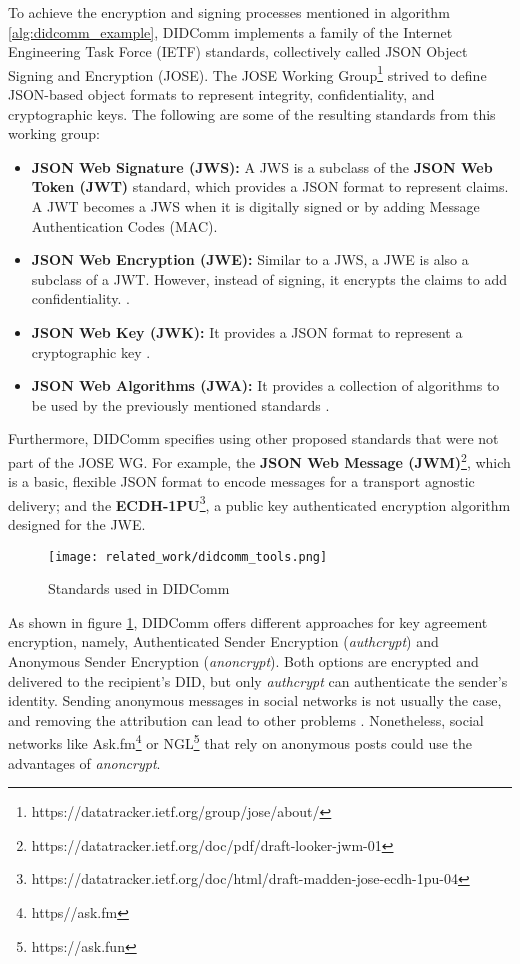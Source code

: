 To achieve the encryption and signing processes mentioned in algorithm \ref{alg:didcomm_example}, DIDComm implements a family of the Internet Engineering Task Force (IETF) standards, collectively called JSON Object Signing and Encryption (JOSE). The JOSE Working Group\footnote{https://datatracker.ietf.org/group/jose/about/} strived to define JSON-based object formats to represent integrity, confidentiality, and cryptographic keys. The following are some of the resulting standards from this working group: 

\begin{itemize}
  \item \textbf{JSON Web Signature (JWS):}  A JWS is a subclass of the \textbf{JSON Web Token (JWT)} standard, which provides a JSON format to represent claims. A JWT becomes a JWS when it is digitally signed or by adding Message Authentication Codes (MAC)\cite{jones_bradley_sakimura_2015}.
  \item \textbf{JSON Web Encryption (JWE):} Similar to a JWS, a JWE is also a subclass of a JWT. However, instead of signing, it encrypts the claims to add confidentiality. \cite{jones_hildebrand_2015}.
  \item \textbf{JSON Web Key (JWK):} It provides a JSON format to represent a cryptographic key \cite{jones_2015}.
  \item \textbf{JSON Web Algorithms (JWA):} It provides a collection of algorithms to be used by the previously mentioned standards \cite{jones_2_2015}.
\end{itemize}

Furthermore, DIDComm specifies using other proposed standards that were not part of the JOSE WG. For example, the \textbf{JSON Web Message (JWM)}\footnote{https://datatracker.ietf.org/doc/pdf/draft-looker-jwm-01}, which is a basic, flexible JSON format to encode messages for a transport agnostic delivery; and the \textbf{ECDH-1PU}\footnote{https://datatracker.ietf.org/doc/html/draft-madden-jose-ecdh-1pu-04}, a public key authenticated encryption algorithm designed for the JWE. 

\begin{figure}[H]
  \centering
  \texttt{[image: related\_work/didcomm\_tools.png]}
  \caption{Standards used in DIDComm \cite{hardman_2021}}
  \label{fig:didcomm_tools}
\end{figure}

As shown in figure \ref{fig:didcomm_tools}, DIDComm offers different approaches for key agreement encryption, namely, Authenticated Sender Encryption (\emph{authcrypt}) and Anonymous Sender Encryption (\emph{anoncrypt}). Both options are encrypted and delivered to the recipient's DID, but only \emph{authcrypt} can authenticate the sender's identity. Sending anonymous messages in social networks is not usually the case, and removing the attribution can lead to other problems \cite{martin_2022}. Nonetheless, social networks like Ask.fm\footnote{https//ask.fm} or NGL\footnote{https://ask.fun} that rely on anonymous posts could use the advantages of \emph{anoncrypt}.


